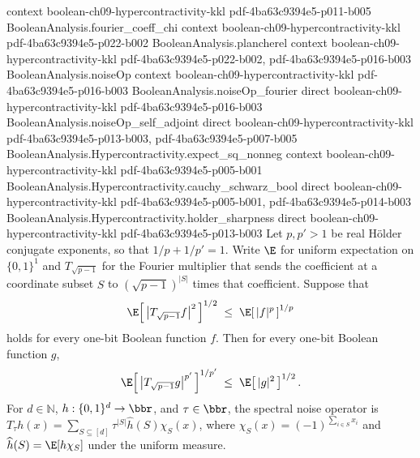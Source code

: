 \begin{theorem}
  {context}
  {boolean-ch09-hypercontractivity-kkl}
  {pdf-4ba63c9394e5-p011-b005}
\proofstep
  {BooleanAnalysis.fourier_coeff_chi}
  {context}
  {boolean-ch09-hypercontractivity-kkl}
  {pdf-4ba63c9394e5-p022-b002}
\proofstep
  {BooleanAnalysis.plancherel}
  {context}
  {boolean-ch09-hypercontractivity-kkl}
  {pdf-4ba63c9394e5-p022-b002,
    pdf-4ba63c9394e5-p016-b003}
\proofstep
  {BooleanAnalysis.noiseOp}
  {context}
  {boolean-ch09-hypercontractivity-kkl}
  {pdf-4ba63c9394e5-p016-b003}
\proofstep
  {BooleanAnalysis.noiseOp_fourier}
  {direct}
  {boolean-ch09-hypercontractivity-kkl}
  {pdf-4ba63c9394e5-p016-b003}
\proofstep
  {BooleanAnalysis.noiseOp_self_adjoint}
  {direct}
  {boolean-ch09-hypercontractivity-kkl}
  {pdf-4ba63c9394e5-p013-b003,
    pdf-4ba63c9394e5-p007-b005}
\proofstep
  {BooleanAnalysis.Hypercontractivity.expect_sq_nonneg}
  {context}
  {boolean-ch09-hypercontractivity-kkl}
  {pdf-4ba63c9394e5-p005-b001}
\proofstep
  {BooleanAnalysis.Hypercontractivity.cauchy_schwarz_bool}
  {direct}
  {boolean-ch09-hypercontractivity-kkl}
  {pdf-4ba63c9394e5-p005-b001,
    pdf-4ba63c9394e5-p014-b003}
\proofstep
  {BooleanAnalysis.Hypercontractivity.holder_sharpness}
  {direct}
  {boolean-ch09-hypercontractivity-kkl}
  {pdf-4ba63c9394e5-p013-b003}
Let $p,p'>1$ be real Hölder conjugate exponents, so that $1/p + 1/p' = 1$.
Write $\E$ for uniform expectation on $\{0,1\}^1$ and $T_{\sqrt{p-1}}$ for the
Fourier multiplier that sends the coefficient at a coordinate subset $S$ to
$(\sqrt{p-1})^{|S|}$ times that coefficient. Suppose that
\[
\E\!\left[\,\bigl|T_{\sqrt{p-1}} f\bigr|^{2}\,\right]^{1/2} \;\le\;
\E\!\left[\,|f|^{p}\,\right]^{1/p}
\]
holds for every one-bit Boolean function $f$. Then for every one-bit Boolean function
$g$,
\[
\E\!\left[\,\bigl|T_{\sqrt{p-1}} g\bigr|^{p'}\,\right]^{1/p'} \;\le\;
\E\!\left[\,|g|^{2}\,\right]^{1/2}.
\] For $d\in\mathbb N$, $h:\{0,1\}^d\to\bbr$, and $\tau\in\bbr$, the spectral noise
operator is $T_\tau h(x)=\sum_{S\subseteq[d]}\tau^{|S|}\widehat h(S)\chi_S(x)$, where
$\chi_S(x)=(-1)^{\sum_{i\in S}x_i}$ and $\widehat h(S)=\E[h\chi_S]$ under the uniform
measure.
\end{theorem}

